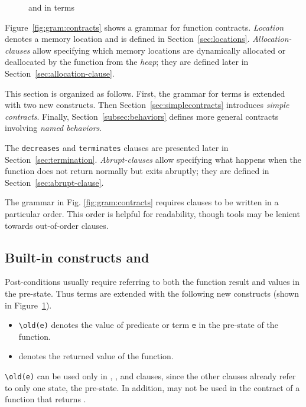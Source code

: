 \begin{figure}[htp]
  \begin{cadre}
      
    \end{cadre}
    \caption{\protect\old and \protect\result in terms}
  \label{fig:gram:oldandresult}
\end{figure}

Figure~\ref{fig:gram:contracts} shows a grammar for function
contracts. \textsl{Location} denotes a memory location and is defined
in Section~\ref{sec:locations}.
\textsl{Allocation-clauses} allow specifying which memory locations
are dynamically allocated or deallocated by the function from the \textsl{heap};
they are defined later in Section~\ref{sec:allocation-clause}.

This section is organized as follows. First, the grammar for terms is
extended with two new constructs.  Then
Section~\ref{sec:simplecontracts} introduces \emph{simple contracts}.
Finally, Section~\ref{subsec:behaviors} defines more general contracts
involving \emph{named behaviors}.

The \lstinline|decreases| and
\lstinline|terminates| clauses are presented later in
Section~\ref{sec:termination}.
\textsl{Abrupt-clauses}
allow specifying what happens when the function does not return
normally but exits abruptly; they are defined in
Section~\ref{sec:abrupt-clause}.

The grammar in Fig. \ref{fig:gram:contracts} requires clauses to be written
in a particular order. This order is helpful for readability, though tools may
be lenient towards out-of-order clauses.

 \subsection{Built-in constructs %
  \texorpdfstring{\old}{\textbackslash{}old} %
 and \texorpdfstring{\result}{\textbackslash{}result}}

Post-conditions usually require referring to both the function result and
values in the pre-state. Thus terms are extended with the following new
constructs (shown in Figure~\ref{fig:gram:oldandresult}).
\begin{itemize}
\item \lstinline|\old(e)| denotes the value of
  predicate or term \lstinline|e| in the pre-state of the function.
\item \result{} denotes the returned value of the function.
\end{itemize}
\lstinline|\old(e)| can be used only in \ensures{}, \assigns{},
\allocates{} and \frees{} clauses, since
the other clauses already refer to only one state, the pre-state.
In addition, \result{} may not be used in the contract of a function that returns
\void{}.


